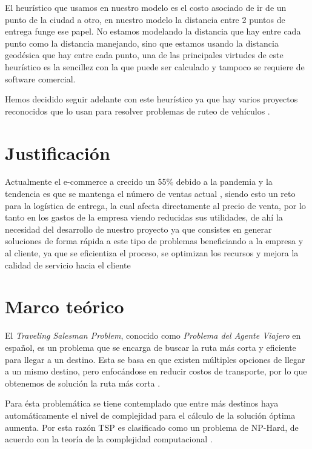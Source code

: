 \documentclass[journal]{IEEEtran}
\begin{document}
        El heurístico que usamos en nuestro modelo es el costo asociado de ir de un punto de la ciudad a otro, en nuestro modelo la distancia entre 2 puntos de entrega funge ese papel. No estamos modelando la distancia que hay entre cada punto como la distancia manejando, sino que estamos usando la distancia geodésica que hay entre cada punto, una de las principales virtudes de este heurístico es la sencillez con la que puede ser calculado y tampoco se requiere de software comercial. 
        
        Hemos decidido seguir adelante con este heurístico ya que hay varios proyectos reconocidos que lo usan para resolver problemas de ruteo de vehículos \cite{ERDOGAN201762}.

    \section{Justificación} \label{sec:justification}

        Actualmente el e-commerce a crecido un 55\% debido a la pandemia y la tendencia es que se mantenga el número de ventas actual \cite{koetsier-2022}, siendo esto un reto para la logística de entrega, la cual afecta directamente al precio de venta, por lo tanto en los gastos de la empresa viendo reducidas sus utilidades, de ahí la necesidad del desarrollo de nuestro proyecto ya que consistes en generar soluciones de forma rápida a este tipo de problemas beneficiando a la empresa y al cliente, ya que se eficientiza el proceso, se optimizan los recursos y mejora la calidad de servicio hacia el cliente

    \section{Marco teórico} \label{sec:theoretical}
    
        El \emph{Traveling Salesman Problem}, conocido como \emph{Problema del Agente Viajero} en español, es un problema que se encarga de buscar la ruta más corta y eficiente para llegar a un destino. Esta se basa en que existen múltiples opciones de llegar a un mismo destino, pero enfocándose en reducir costos de transporte, por lo que obtenemos de solución la ruta más corta \cite{trevelingProb}.

        Para ésta problemática se tiene contemplado que entre más destinos haya automáticamente el nivel de complejidad para el cálculo de la solución óptima aumenta. Por esta razón TSP es clasificado como un problema de NP-Hard, de acuerdo con la teoría de la complejidad computacional \cite{trevelingProb}.
\end{document}
